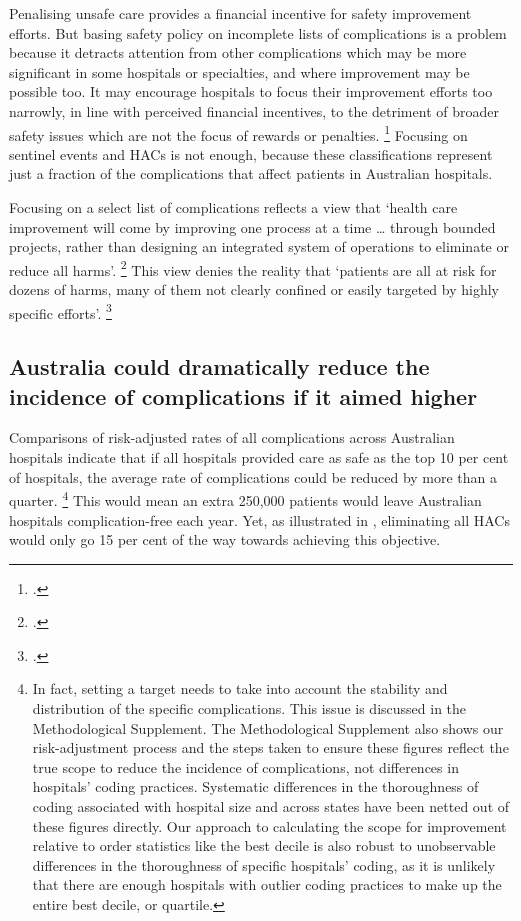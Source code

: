 \documentclass[FrontPage]{grattan}
\begin{document}
Penalising unsafe care provides a financial incentive for safety improvement efforts.
But basing safety policy on incomplete lists of complications is a problem because it detracts attention from other complications which may be more significant in some hospitals or specialties, and where improvement may be possible too.
It may encourage hospitals to focus their improvement efforts too narrowly, in line with perceived financial incentives, to the detriment of broader safety issues which are not the focus of rewards or penalties.%
	\footcite{Gillam_2012}
Focusing on sentinel events and HACs is not enough, because these classifications represent just a fraction of the complications that affect patients in Australian hospitals.

Focusing on a select list of complications reflects a view that `health care improvement will come by improving one process at a time \ldots{} through bounded projects, rather than designing an integrated system of operations to eliminate or reduce all harms'.%
	\footcite{pronovost2017creating}
This view denies the reality that `patients are all at risk for dozens of harms, many of them not clearly confined or easily targeted by highly specific efforts'.%
	\footcite{pronovost2017creating}

\subsection{Australia could dramatically reduce the incidence of complications if it aimed higher}\label{subsec:australia-could-dramatically-reduce-the-incidence-of-complications-if-it-aimed-higher}

Comparisons of risk-adjusted rates of all complications across Australian hospitals indicate that if all hospitals provided care as safe as the top 10 per cent of hospitals, the average rate of complications could be reduced by more than a quarter.%
	\footnote{In fact, setting a target needs to take into account the stability and distribution of the specific complications.
	This issue is discussed in the Methodological Supplement.
	The Methodological Supplement also shows our risk-adjustment process and the steps taken to ensure these figures reflect the true scope to reduce the incidence of complications, not differences in hospitals' coding practices.
	Systematic differences in the thoroughness of coding associated with hospital size and across states have been netted out of these figures directly.
	Our approach to calculating the scope for improvement relative to order statistics like the best decile is also robust to unobservable differences in the thoroughness of specific hospitals' coding, as it is unlikely that there are enough hospitals with outlier coding practices to make up the entire best decile, or quartile.}
This would mean an extra 250,000 patients would leave Australian hospitals complication-free each year.
Yet, as illustrated in , eliminating all HACs would only go 15 per cent of the way towards achieving this objective.
\end{document}
